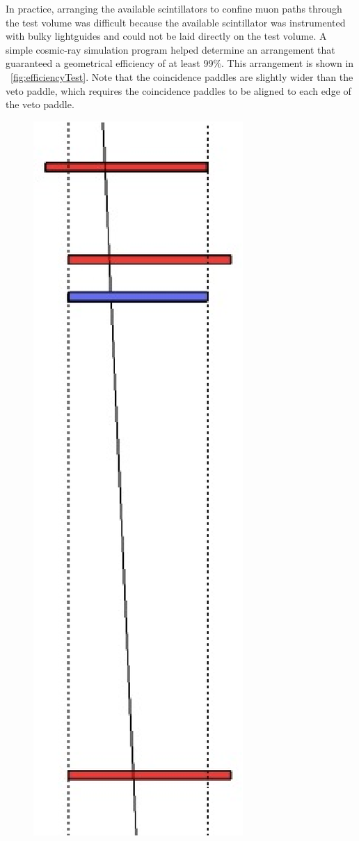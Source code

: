 In practice, arranging the available scintillators to confine muon paths through the test volume was difficult because the available scintillator was instrumented with bulky lightguides and could not be laid directly on the test volume.  A simple cosmic-ray simulation program helped determine an arrangement that guaranteed a geometrical efficiency of at least 99\%.  This arrangement is shown in {\fig}~\ref{fig:efficiencyTest}.  Note that the coincidence paddles are slightly wider than the veto paddle, which requires the coincidence paddles to be aligned to each edge of the veto paddle.  
\begin{figure}[!htbp]
\centering
\includegraphics[height=0.4\textheight]{figures/veto_test_layout.eps}

\end{figure}
